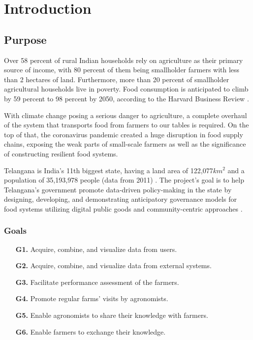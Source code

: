 \chapter{Introduction}

\section{Purpose}



Over 58 percent of rural Indian households rely on agriculture as their primary source of income, with 80 percent of them being smallholder farmers with less than 2 hectares of land. Furthermore, more than 20 percent of smallholder agricultural households live in poverty. Food consumption is anticipated to climb by 59 percent to 98 percent by 2050, according to the Harvard Business Review \cite{global_demand_for_food}.

With climate change posing a serious danger to agriculture, a complete overhaul of the system that transports food from farmers to our tables is required. On the top of that, the coronavirus pandemic created a huge disruption in food supply chains, exposing the weak parts of small-scale farmers as well as the significance of constructing resilient food systems.

Telangana is India's 11th biggest state, having a land area of 122,077$km^2$ and a population of 35,193,978 people (data from 2011) \cite{telangana}. The project's goal is to help Telangana’s government promote data-driven policy-making in the state by designing, developing, and demonstrating anticipatory governance models for food systems utilizing digital public goods and community-centric approaches \cite{reference_doc}.

\subsection{Goals} \label{subsec:goals}
\begin{itemize}
	\item [\textbf{G1.}] Acquire, combine, and visualize data from users.
	\item [\textbf{G2.}] Acquire, combine, and visualize data from external systems. 
	\item [\textbf{G3.}] Facilitate performance assessment of the farmers.
	\item [\textbf{G4.}] Promote regular farms' visits by agronomists.
	\item [\textbf{G5.}] Enable agronomists to share their knowledge with farmers.
	\item [\textbf{G6.}] Enable farmers to exchange their knowledge.
\end{itemize}


